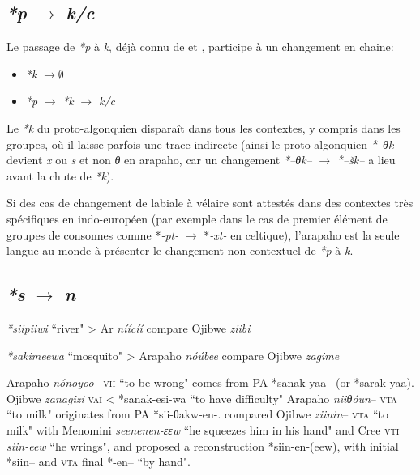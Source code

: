 \documentclass[twoside,a4paper,11pt]{article}
\newcommand{\ipa}[1]{{\phon\textit{#1}}}
\newcommand{\Σ}{\greek{Σ}}
\begin{document}
\subsection{\ipa{*p} $\rightarrow$ \ipa{k/c} }
Le passage de \ipa{*p} à \ipa{k}, déjà connu de \citet{kroeber16arapaho} et \citet{michelson35shifts}, participe à un changement en chaine:

\begin{itemize}
\item \ipa{*k} $\rightarrow \emptyset$
\item \ipa{*p} $\rightarrow$ \ipa{*k} $\rightarrow$  \ipa{k/c}
\end{itemize}

Le  \ipa{*k} du proto-algonquien disparaît dans tous les contextes, y compris dans les groupes, où il laisse parfois une trace indirecte (ainsi le proto-algonquien \ipa{*--θk--} devient \ipa{x} ou \ipa{s} et non \ipa{θ} en arapaho, car un changement \ipa{*--θk--} $\rightarrow $  \ipa{*--šk--} a lieu avant la chute de \ipa{*k}).

Si des cas de changement de labiale à vélaire sont attestés dans des contextes très spécifiques en indo-européen (par exemple dans le cas de premier élément de groupes de consonnes comme *\ipa{-pt-} $\rightarrow$ *\ipa{-xt-} en celtique), l'arapaho est la seule langue au monde à présenter le changement non contextuel de  \ipa{*p} à \ipa{k}.



\subsection{\ipa{*s} $\rightarrow$ \ipa{n} }

 \ipa{*siipiiwi} ``river" >  Ar \ipa{níícíí}   compare Ojibwe \ipa{ziibi}

\ipa{*sakimeewa} ``mosquito" > Arapaho \ipa{nóúbee}  compare Ojibwe \ipa{zagime}

 Arapaho \textit{nónoyoo}-- \textsc{vii} ``to be wrong" comes from PA *sanak-yaa-- (or *sarak-yaa).  Ojibwe \textit{zanagizi} \textsc{vai} < *sanak-esi-wa ``to have difficulty"
Arapaho \textit{niiθóun}-- \textsc{vta} ``to milk" originates from PA *sii-θakw-en-.   \citet{hewson93proto} compared  Ojibwe \textit{ziinin}-- \textsc{vta} ``to milk" with Menomini \textit{seenenen-ɛɛw} ``he squeezes him in his hand" and Cree \textsc{vti} \textit{siin-eew} ``he wrings", and proposed a reconstruction *siin-en-(eew), with initial *siin-- and \textsc{vta} final *-en-- ``by hand". 
\end{document}
